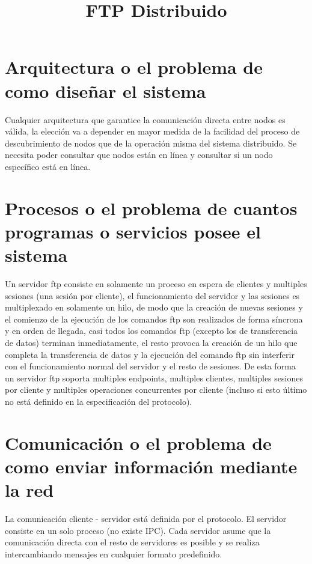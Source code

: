 \documentclass{llncs}
\begin{document}
%
%
\pagestyle{headings}  %
%
\title{FTP Distribuido}
%
\author{}
%
\institute{}

\maketitle              %

\section*{Arquitectura o el problema de como diseñar el sistema}

Cualquier arquitectura que garantice la comunicación directa entre nodos es válida, la elección va a depender
en mayor medida de la facilidad del proceso de descubrimiento de nodos que de la operación misma del sistema
distribuido. Se necesita poder consultar que nodos están en línea y consultar si un nodo específico está en línea.

\section*{Procesos o el problema de cuantos programas o servicios posee el sistema}

Un servidor ftp consiste en solamente un proceso en espera de clientes y multiples sesiones (una sesión por cliente),
el funcionamiento del servidor y las sesiones es multiplexado en solamente un hilo, de modo que la creación de nuevas
sesiones y el comienzo de la ejecución de los comandos ftp son realizados de forma síncrona y en orden de llegada,
casi todos los comandos ftp (excepto los de transferencia de datos) terminan inmediatamente, el resto provoca la creación
de un hilo que completa la transferencia de datos y la ejecución del comando ftp sin interferir con el funcionamiento
normal del servidor y el resto de sesiones. De esta forma un servidor ftp soporta multiples endpoints, multiples clientes,
multiples sesiones por cliente y multiples operaciones concurrentes por cliente (incluso si esto último no está definido
en la especificación del protocolo).

\section*{Comunicación o el problema de como enviar información mediante la red}

La comunicación cliente - servidor está definida por el protocolo. El servidor consiste en un solo proceso (no existe IPC).
Cada servidor asume que la comunicación directa con el resto de servidores es posible y se realiza intercambiando mensajes
en cualquier formato predefinido.
\end{document}
